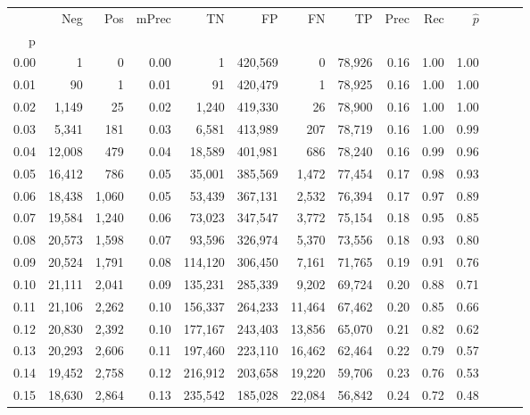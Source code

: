 \begin{tabular}{rrrrrrrrrrrrrr}
\toprule
{} &     Neg &    Pos & mPrec &       TN &       FP &      FN &      TP &  Prec &   Rec & $\hat{p}$ \\
p    &         &        &       &          &          &         &         &       &       &           \\
\midrule
0.00 &       1 &      0 &  0.00 &        1 &  420,569 &       0 &  78,926 &  0.16 &  1.00 &      1.00 \\
0.01 &      90 &      1 &  0.01 &       91 &  420,479 &       1 &  78,925 &  0.16 &  1.00 &      1.00 \\
0.02 &   1,149 &     25 &  0.02 &    1,240 &  419,330 &      26 &  78,900 &  0.16 &  1.00 &      1.00 \\
0.03 &   5,341 &    181 &  0.03 &    6,581 &  413,989 &     207 &  78,719 &  0.16 &  1.00 &      0.99 \\
0.04 &  12,008 &    479 &  0.04 &   18,589 &  401,981 &     686 &  78,240 &  0.16 &  0.99 &      0.96 \\
0.05 &  16,412 &    786 &  0.05 &   35,001 &  385,569 &   1,472 &  77,454 &  0.17 &  0.98 &      0.93 \\
0.06 &  18,438 &  1,060 &  0.05 &   53,439 &  367,131 &   2,532 &  76,394 &  0.17 &  0.97 &      0.89 \\
0.07 &  19,584 &  1,240 &  0.06 &   73,023 &  347,547 &   3,772 &  75,154 &  0.18 &  0.95 &      0.85 \\
0.08 &  20,573 &  1,598 &  0.07 &   93,596 &  326,974 &   5,370 &  73,556 &  0.18 &  0.93 &      0.80 \\
0.09 &  20,524 &  1,791 &  0.08 &  114,120 &  306,450 &   7,161 &  71,765 &  0.19 &  0.91 &      0.76 \\
0.10 &  21,111 &  2,041 &  0.09 &  135,231 &  285,339 &   9,202 &  69,724 &  0.20 &  0.88 &      0.71 \\
0.11 &  21,106 &  2,262 &  0.10 &  156,337 &  264,233 &  11,464 &  67,462 &  0.20 &  0.85 &      0.66 \\
0.12 &  20,830 &  2,392 &  0.10 &  177,167 &  243,403 &  13,856 &  65,070 &  0.21 &  0.82 &      0.62 \\
0.13 &  20,293 &  2,606 &  0.11 &  197,460 &  223,110 &  16,462 &  62,464 &  0.22 &  0.79 &      0.57 \\
0.14 &  19,452 &  2,758 &  0.12 &  216,912 &  203,658 &  19,220 &  59,706 &  0.23 &  0.76 &      0.53 \\
0.15 &  18,630 &  2,864 &  0.13 &  235,542 &  185,028 &  22,084 &  56,842 &  0.24 &  0.72 &      0.48 \\

\end{tabular}
